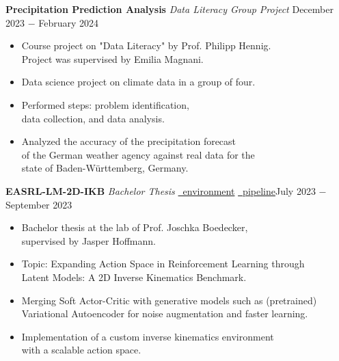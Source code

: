 \documentclass{article}
\begin{document}
\noindent \textbf{Precipitation Prediction Analysis} \textit{Data Literacy Group Project} \href{https://github.com/RobinU434/PrecipitationPredictionAnalysis}{\faGithubSquare}\hfill December 2023 $-$ February 2024
\begin{itemize}[noitemsep,nolistsep,leftmargin=*]
    \item Course project on "Data Literacy" by Prof. Philipp Hennig. \\
    Project was supervised by Emilia Magnani. 
    \item Data science project on climate data in a group of four.
    \item Performed steps: problem identification, \\ data collection, and data analysis.
    \item Analyzed the accuracy of the precipitation forecast \\
    of the German weather agency against real data for the \\
    state of Baden-Württemberg, Germany.\\
\end{itemize}

\noindent \textbf{EASRL-LM-2D-IKB} \textit{Bachelor Thesis} \href{https://github.com/RobinU434/IK-RL}{\faGithubSquare \ environment} \href{https://github.com/RobinU434/SPARK/tree/v0.0.1-bachelor-thesis-submission}{\faGithubSquare \ pipeline}\hfill July 2023 $-$ September 2023
\begin{itemize}[noitemsep,nolistsep,leftmargin=*]
    \item Bachelor thesis at the lab of Prof. Joschka Boedecker, \\ 
    supervised by Jasper Hoffmann.  
    \item Topic: Expanding Action Space in Reinforcement Learning through \\ Latent Models: A 2D Inverse Kinematics Benchmark.
    \item Merging Soft Actor-Critic with generative models such as (pretrained) \\
    Variational Autoencoder for noise augmentation and faster learning.
    \item Implementation of a custom inverse kinematics environment \\ 
    with a scalable action space. \\
\end{itemize} 
\end{document}
